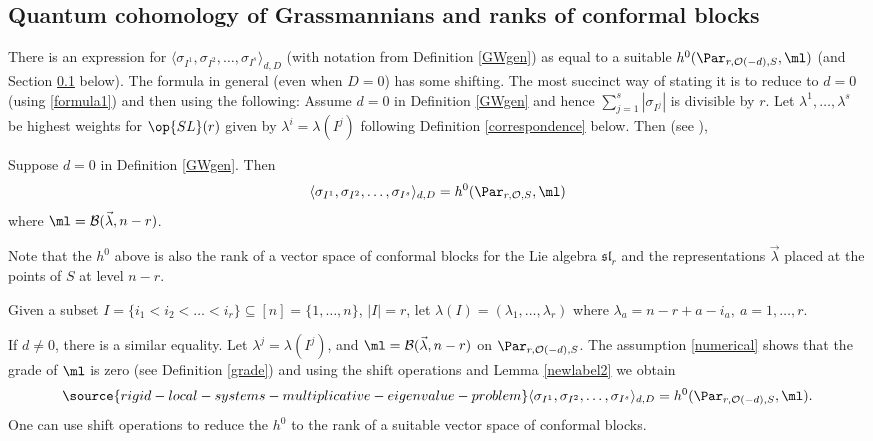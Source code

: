 \subsection{Quantum cohomology of Grassmannians and ranks of conformal blocks}\label{QCB}
There is an expression for  $\langle\sigma_{I^1}, \sigma_{I^2},\dots,\sigma_{I^s}\rangle_{d,D}$ (with notation from Definition \ref{GWgen}) as equal to  a suitable  $h^0(\Par_{r,\mathcal{O}(-d),S},\ml)$ \cites{Gepner,Witten} (and Section \ref{QCB} below). The formula in general (even when $D=0$) has some shifting. The most succinct way of stating it is to reduce to $d=0$ (using \eqref{formula1}) and then using the following: Assume $d=0$ in Definition \ref{GWgen} and hence $\sum_{j=1}^s |\sigma_{I^j}|$ is divisible by $r$.
Let $\lambda^1,\dots,\lambda^s$ be highest weights for $\op{SL}(r)$ given by $\lambda^i=\lambda(I^j)$ following Definition \ref{correspondence} below. Then  (see \cite[Proposition 3.4]{BHorn}),
\begin{lemma}
\notready\label{newlabel2}
Suppose $d=0$ in Definition \ref{GWgen}. Then
$$\langle\sigma_{I^1}, \sigma_{I^2},\dots,\sigma_{I^s}\rangle_{d,D}= h^0(\Par_{r,\mathcal{O},S},\ml)$$ where $\ml=\mathcal{B}(\vec{\lambda},n-r)$.
\end{lemma}
Note that the $h^0$ above is also the rank of a vector space of conformal blocks for the Lie algebra $\mathfrak{sl}_r$ and the representations $\vec{\lambda}$ placed at the points of $S$ at level $n-r$.
\begin{defi}
\notready\label{correspondence}
Given a subset $I=\{i_1<i_2<\dots<i_r\}\subseteq [n]=\{1,\dots,n\}$, $|I|=r$, let $\lambda(I)=(\lambda_1,\dots,\lambda_r)$ where
$\lambda_a=n-r+a-i_a,\ a=1,\dots,r.$
\end{defi}
If $d\neq 0$, there is a similar equality. Let $\lambda^j=\lambda(I^j)$, and $\ml=\mathcal{B}(\vec{\lambda},n-r)$ on $\Par_{r,\mathcal{O}(-d),S}$. The assumption \eqref{numerical} shows that the grade of $\ml$ is zero (see Definition  \ref{grade}) and using the shift operations and Lemma \ref{newlabel2} we obtain
\begin{equation}\label{newlabel3}
\source{rigid-local-systems-multiplicative-eigenvalue-problem}
\langle\sigma_{I^1}, \sigma_{I^2},\dots,\sigma_{I^s}\rangle_{d,D}= h^0(\Par_{r,\mathcal{O}(-d),S},\ml).
\end{equation}
One can use shift operations to reduce the $h^0$ to the rank of a suitable vector space of conformal blocks.

